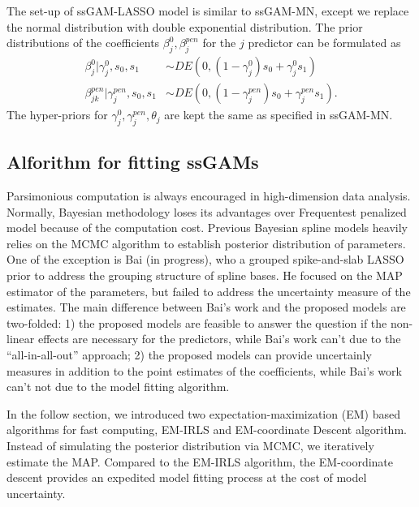 \documentclass[AMA,STIX1COL,]{WileyNJD-v2}
\begin{document}
The set-up of ssGAM-LASSO model is similar to ssGAM-MN, except we
replace the normal distribution with double exponential distribution.
The prior distributions of the coefficients \(\beta^0_j, \beta^{pen}_j\)
for the \(j\) predictor can be formulated as \[
\begin{aligned}
  \beta^0_{j} |\gamma^0_{j},s_0,s_1 &\sim DE(0,(1-\gamma^0_{j}) s_0 + \gamma^0_{j} s_1)\\
  \beta^{pen}_{jk} | \gamma^{pen}_{j},s_0,s_1 &\sim DE(0,(1-\gamma^{pen}_{j}) s_0 + \gamma^{pen}_{j} s_1).
\end{aligned}
\] The hyper-priors for \(\gamma^0_j, \gamma^{pen}_j, \theta_j\) are
kept the same as specified in ssGAM-MN.

\hfill\break

\hypertarget{alforithm-for-fitting-ssgams}{%
\subsection{Alforithm for fitting
ssGAMs}\label{alforithm-for-fitting-ssgams}}

Parsimonious computation is always encouraged in high-dimension data
analysis. Normally, Bayesian methodology loses its advantages over
Frequentest penalized model because of the computation cost. Previous
Bayesian spline models heavily relies on the MCMC algorithm to establish
posterior distribution of parameters. One of the exception is Bai (in
progress), who a grouped spike-and-slab LASSO prior \citep{Rockova2018}
to address the grouping structure of spline bases. He focused on the MAP
estimator of the parameters, but failed to address the uncertainty
measure of the estimates. The main difference between Bai's work and the
proposed models are two-folded: 1) the proposed models are feasible to
answer the question if the non-linear effects are necessary for the
predictors, while Bai's work can't due to the ``all-in-all-out''
approach; 2) the proposed models can provide uncertainly measures in
addition to the point estimates of the coefficients, while Bai's work
can't not due to the model fitting algorithm.

In the follow section, we introduced two expectation-maximization (EM)
based algorithms for fast computing, EM-IRLS and EM-coordinate Descent
algorithm. Instead of simulating the posterior distribution via MCMC, we
iteratively estimate the MAP. Compared to the EM-IRLS algorithm, the
EM-coordinate descent provides an expedited model fitting process at the
cost of model uncertainty.
\end{document}

